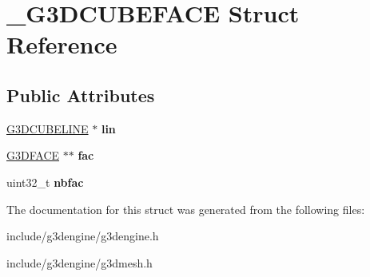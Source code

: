 \hypertarget{struct__G3DCUBEFACE}{}\section{\+\_\+\+G3\+D\+C\+U\+B\+E\+F\+A\+CE Struct Reference}
\label{struct__G3DCUBEFACE}
\subsection*{Public Attributes}
\begin{DoxyCompactItemize}
\item 
\mbox{\label{struct__G3DCUBEFACE_a0198b0026ee5828ee53b36092c5049e8}} 
\hyperlink{struct__G3DCUBEEDGE}{G3\+D\+C\+U\+B\+E\+L\+I\+NE} $\ast$ {\bfseries lin}
\item 
\mbox{\label{struct__G3DCUBEFACE_abc074bf0f6d924e5e089b327f8376f70}} 
\hyperlink{struct__G3DFACE}{G3\+D\+F\+A\+CE} $\ast$$\ast$ {\bfseries fac}
\item 
\mbox{\label{struct__G3DCUBEFACE_aa3d135bd9cebed3f63ea4f0c9917a9bb}} 
uint32\+\_\+t {\bfseries nbfac}
\end{DoxyCompactItemize}


The documentation for this struct was generated from the following files\+:\begin{DoxyCompactItemize}
\item 
include/g3dengine/g3dengine.\+h\item 
include/g3dengine/g3dmesh.\+h\end{DoxyCompactItemize}
